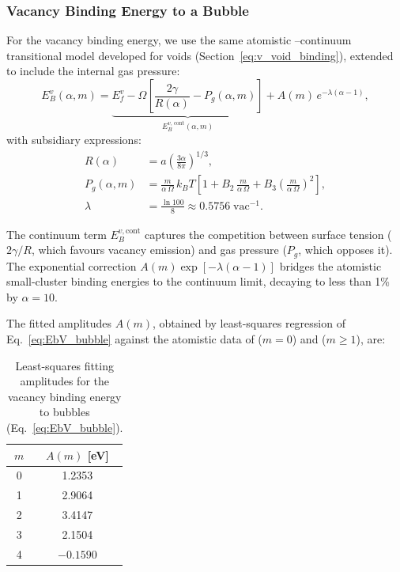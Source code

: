 \documentclass[pdflatex,sn-basic]{sn-jnl} %
\begin{document}
\subsubsection{Vacancy Binding Energy to a Bubble}
\label{sec:bubble_Ebv}

For the vacancy binding energy, we use the same atomistic
–continuum transitional model developed for voids (Section~\ref{eq:v_void_binding}), extended to
include the internal gas pressure:
\begin{equation}\label{eq:EbV_bubble}
  E_B^v(\alpha, m) =
  \underbrace{E_f^v - \Omega\!\left[\frac{2\gamma}{R(\alpha)} - P_g(\alpha, m)\right]}_{E_B^{v,\,\mathrm{cont}}(\alpha,m)}
  + A(m)\,e^{-\lambda(\alpha - 1)},
\end{equation}
with subsidiary expressions:
\begin{align}
  R(\alpha) &= a\!\left(\frac{3\alpha}{8\pi}\right)^{1/3}, \label{eq:R_alpha} \\
  P_g(\alpha,m) &= \frac{m}{\alpha\,\Omega}\,k_B T
    \!\left[1 + B_2\,\frac{m}{\alpha\,\Omega}
             + B_3\!\left(\frac{m}{\alpha\,\Omega}\right)^{\!2}\right],
    \label{eq:Pg} \\
  \lambda &= \frac{\ln 100}{8} \approx 0.5756\;\mathrm{vac}^{-1}.
    \label{eq:lambda}
\end{align}

The continuum term $E_B^{v,\mathrm{cont}}$ captures the competition between
surface tension ($2\gamma/R$, which favours vacancy emission) and gas pressure
($P_g$, which opposes it). The exponential correction
$A(m)\exp[-\lambda(\alpha-1)]$ bridges the atomistic small-cluster binding
energies to the continuum limit, decaying to less than 1\% by $\alpha = 10$.

The fitted amplitudes $A(m)$, obtained by least-squares regression of
Eq.~\eqref{eq:EbV_bubble} against the atomistic data of
\citet{Osetsky2000} ($m=0$) and
\citet{Caturla2008HeKineticModelling} ($m \geq 1$), are:
\begin{table}[htbp]
    \centering
    \caption{Least-squares fitting amplitudes for the vacancy binding energy
    to bubbles (Eq.~\ref{eq:EbV_bubble}).}
    \label{tab:A_vacancy_bubble}
    \begin{tabular}{cc}
    \toprule
      $m$ & $A(m)$ [eV] \\
    \midrule
      0 & 1.2353 \\
      1 & 2.9064 \\
      2 & 3.4147 \\
      3 & 2.1504 \\
      4 & $-0.1590$ \\
    \bottomrule
    \end{tabular}
\end{table}
\end{document}
